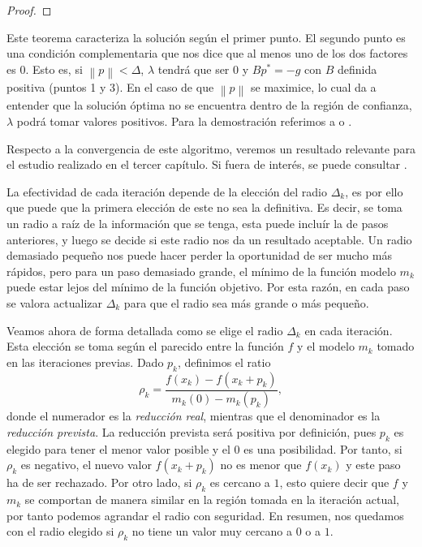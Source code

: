 \documentclass[11pt,a4paper]{book}
\theoremstyle{definition}
\theoremstyle{remark}
\newcommand{\norm}[1]{\left\lVert#1\right\rVert}
\begin{document}
\begin{proof}
\end{proof}

Este teorema caracteriza la solución según el primer punto. El segundo punto es una condición complementaria que nos dice que al menos uno de los dos factores es 0.
Esto es, si $\norm{p}<\Delta$, $\lambda$ tendrá que ser 0 y $Bp^*=-g$ con $B$ definida positiva (puntos 1 y 3).
En el caso de que $\norm{p}$ se maximice, lo cual da a entender que la solución óptima no se encuentra dentro de la región de confianza, $\lambda$ podrá tomar valores positivos.
Para la demostración referimos a \cite[Sección 4.3]{Nocedal2006-kh} o \cite[Teorema 6.1]{Sun2006-au}.

Respecto a la convergencia de este algoritmo, veremos un resultado relevante para el estudio realizado en el
tercer capítulo.
Si fuera de interés, se puede consultar \cite[Sección 6.1.2]{Sun2006-au}.


La efectividad de cada iteración depende de la elección del radio $\Delta_k$, es por ello que
puede que la primera elección de este no sea la definitiva. Es decir, se toma un radio a raíz
de la información que se tenga, esta puede incluír la de pasos anteriores, y luego se decide si
este radio nos da un resultado aceptable. Un radio demasiado pequeño nos puede hacer perder la
oportunidad de ser mucho más rápidos, pero para un paso demasiado grande, el mínimo de la función
modelo $m_k$ puede estar lejos del mínimo de la función objetivo. Por esta razón, en cada paso
se valora actualizar $\Delta_k$ para que el radio sea más grande o más pequeño.

Veamos ahora de forma detallada como se elige el radio $\Delta_k$ en cada iteración. Esta elección
se toma según el parecido entre la función $f$ y el modelo $m_k$ tomado en las iteraciones previas.
Dado $p_k$, definimos el ratio
\begin{equation}
\label{eq:rho_k}
	\rho_k = \frac{f(x_k)-f(x_k+p_k)}{m_k(0)-m_k(p_k)},
\end{equation}
donde el numerador es la \textit{reducción real}, mientras que el denominador es la \textit{reducción prevista}.
La reducción prevista será positiva por definición, pues $p_k$ es elegido para tener el menor valor posible y el $0$ es una posibilidad.
Por tanto, si $\rho_k$ es negativo, el nuevo valor $f(x_k+p_k)$ no es menor que $f(x_k)$ y este paso ha de ser rechazado.
Por otro lado, si $\rho_k$ es cercano a $1$, esto quiere decir que $f$ y $m_k$ se comportan de manera similar en la región tomada en la iteración actual, por tanto podemos agrandar el radio con seguridad.
En resumen, nos quedamos con el radio elegido si $\rho_k$ no tiene un valor muy cercano a $0$ o a $1$.
\end{document}
